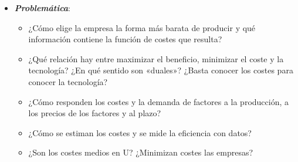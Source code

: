 \documentclass[11pt]{article}
\begin{document}
\begin{itemize}
\begin{itemize}
\begin{itemize}
    \item \textcite{ChristensenJorgensonLau1973Transcendental} proponen la forma translogarítmica;
    \item \textcite{ChristensenGreene1976Economies} la aplican a los costes.
    \end{itemize}
  \item En paralelo, \textcite{Farrell1957Measurement} define la eficiencia técnica y la asignativa, que medirán la frontera estocástica\nocite{AignerLovellSchmidt1977Formulation,MeeusenVandenBroeck1977Efficiency} y el análisis envolvente de datos\nocite{CharnesCooperRhodes1978Measuring}.
  \item Desde la organización industrial, \textcite{Stigler1939Production} cuestiona la forma en U del coste medio y \textcite{Leibenstein1966Allocative}, que las empresas minimicen el coste.
  \item El término  tiene dos sentidos:
    \begin{itemize}
    \item \emph{en sentido estricto}, designa la relación entre dos problemas que intercambian la función objetivo y la restricción: minimizar el coste de producir una cantidad dada y maximizar la producción con un coste dado;
    \item \emph{en sentido amplio}, se aplica a cualquier par de problemas o conceptos formalmente parecidos salvo por el papel invertido de objetivo y restricción, de cantidades y precios o de máximo y mínimo\nocite{MasColellWhinstonGreen1995,Blume2008Duality}.
    \end{itemize}
  \item En la teoría de la empresa domina el sentido amplio. Se habla de «dualidad» entre la maximización del beneficio y la minimización del coste, aunque no son duales en sentido estricto (la primera incorpora los ingresos), y entre la función de costes y la tecnología que se recupera a partir de ella. Por eso aquí se escribe «dualidad» entre comillas cuando se trata del primer par.
  \end{itemize}

\item \textbf{\emph{Problemática}}:
  \begin{itemize}
  \item ¿Cómo elige la empresa la forma más barata de producir y qué información contiene la función de costes que resulta?
  \item ¿Qué relación hay entre maximizar el beneficio, minimizar el coste y la tecnología? ¿En qué sentido son «duales»? ¿Basta conocer los costes para conocer la tecnología?
  \item ¿Cómo responden los costes y la demanda de factores a la producción, a los precios de los factores y al plazo?
  \item ¿Cómo se estiman los costes y se mide la eficiencia con datos?
  \item ¿Son los costes medios en U? ¿Minimizan costes las empresas?
  \end{itemize}


\end{itemize}
\end{document}
